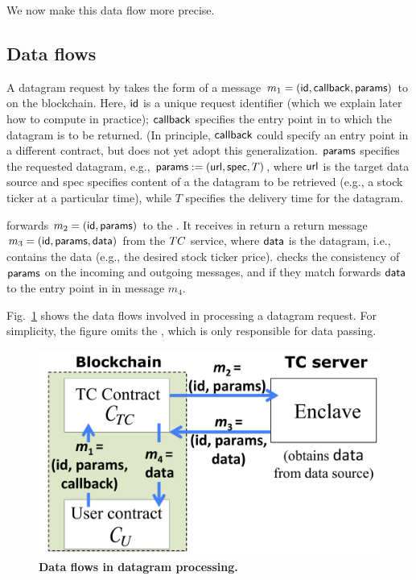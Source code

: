 We now make this data flow more precise. 

\subsection{Data flows}

A datagram request by \reqcont takes the form of a message $m_1 = ({\sf id}, {\sf callback}, {\sf params})$ to \tcont on the blockchain. Here, ${\sf id}$ is a unique request identifier (which we explain later how to compute in practice); ${\sf callback}$ specifies the entry point in \reqcont to which the datagram is to be returned. (In principle, ${\sf callback}$ could specify an entry point in a different contract, but \tc does not yet adopt this generalization. ${\sf params}$ specifies the requested datagram, e.g., ${\sf params} := ({{\sf url}}, {\sf spec}, T)$, where ${{\sf url}}$ is the target data source and {\sf spec} specifies content of a the datagram to be retrieved (e.g., a stock ticker at a particular time), while $T$ specifies the delivery time for the datagram. 

\tcont forwards $m_2 = ({\sf id}, {\sf params})$ to the \encname. It receives in return a return message $m_3 = ({\sf id}, {\sf params}, {\sf data})$ from the $TC$ service, where ${\sf data}$ is the datagram, i.e., contains the data (e.g., the desired stock ticker price). \tcont checks the consistency of ${\sf params}$ on the incoming and outgoing messages, and if they match forwards ${\sf data}$ to the entry point \dgcallback in \reqcont in message $m_4$. 

Fig.~\ref{fig:dataflow} shows the data flows involved in processing a datagram request. For simplicity, the figure omits the \medname, which is only responsible for data passing.


\begin{figure}[h!]
\centering
\includegraphics[width=\columnwidth]{figures/DataflowFig}
\caption{{\bf Data flows in datagram processing.}}
\label{fig:dataflow}
\end{figure}


